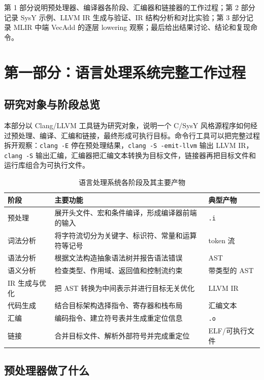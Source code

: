 \documentclass[a4paper]{article}
\begin{document}
第 1 部分说明预处理器、编译器各阶段、汇编器和链接器的工作过程；第 2 部分记录 SysY 示例、LLVM IR 生成与验证、IR 结构分析和对比实验；第 3 部分记录 MLIR 中端 VecAdd 的逐层 lowering 观察；最后给出结果讨论、结论和复现命令。

\section{第一部分：语言处理系统完整工作过程}

\subsection{研究对象与阶段总览}

本部分以 Clang/LLVM 工具链为研究对象，说明一个 C/SysY 风格源程序如何经过预处理、编译、汇编和链接，最终形成可执行目标。命令行工具可以把完整过程拆开观察：\texttt{clang -E} 停在预处理结果，\texttt{clang -S -emit-llvm} 输出 LLVM IR，\texttt{clang -S} 输出汇编，汇编器把汇编文本转换为目标文件，链接器再把目标文件和运行库组合为可执行文件。

\begin{table}[H]
  \centering
  \caption{语言处理系统各阶段及其主要产物}
  \label{tab:pipeline}
  \begin{tabular}{p{}p{}p{}}
    \toprule
    阶段 & 主要功能 & 典型产物 \\
    \midrule
    预处理 & 展开头文件、宏和条件编译，形成编译器前端的输入 & \texttt{.i} \\
    词法分析 & 将字符流切分为关键字、标识符、常量和运算符等记号 & token 流 \\
    语法分析 & 根据文法构造抽象语法树并报告语法错误 & AST \\
    语义分析 & 检查类型、作用域、返回值和控制流约束 & 带类型的 AST \\
    IR 生成与优化 & 把 AST 转换为中间表示并进行目标无关优化 & LLVM IR \\
    代码生成 & 结合目标架构选择指令、寄存器和栈布局 & 汇编文本 \\
    汇编 & 编码指令、建立符号表并生成重定位信息 & \texttt{.o} \\
    链接 & 合并目标文件、解析外部符号并完成重定位 & ELF/可执行文件 \\
    \bottomrule
  \end{tabular}
\end{table}

\subsection{预处理器做了什么}
\end{document}
